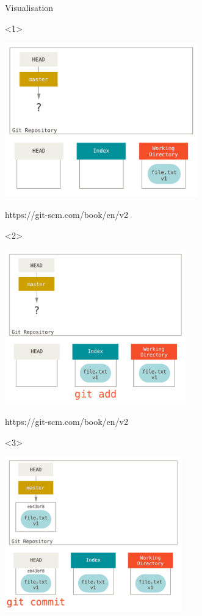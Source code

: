 \documentclass[presentation,aspectratio=169,smaller]{beamer}
\begin{document}
\begin{frame}[label={sec:org1e2aa27}]{Visualisation}
\begin{onlyenv}<1>
\begin{center}
\includegraphics[height=6.7cm]{images/head-0.png}
\end{center}

\scriptsize{https://git-scm.com/book/en/v2}
\end{onlyenv}

\begin{onlyenv}<2>
\begin{center}
\includegraphics[height=6.7cm]{images/head-1.png}
\end{center}

\scriptsize{https://git-scm.com/book/en/v2}
\end{onlyenv}

\begin{onlyenv}<3>
\begin{center}
\includegraphics[height=6.7cm]{images/head-2.png}
\end{center}


\end{onlyenv}
\end{frame}
\end{document}
